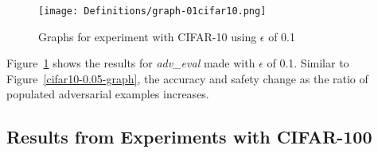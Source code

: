 \documentclass[symmetry,article,submit,moreauthors,pdftex]{Definitions/mdpi}
\begin{document}
\begin{figure}[H]
    \texttt{[image: Definitions/graph-01cifar10.png]}
    \caption{Graphs for experiment with CIFAR-10 using \begin{math}\epsilon\end{math} of 0.1\label{cifar10-0.1-graph}}
\end{figure}

Figure~\ref{cifar10-0.1-graph} shows the results for {\it adv\_eval} made with \begin{math}\epsilon\end{math} of 0.1.
Similar to Figure~\ref{cifar10-0.05-graph}, the accuracy and safety change as the ratio of populated adversarial examples increases.

\subsection{Results from Experiments with CIFAR-100}
\end{document}
